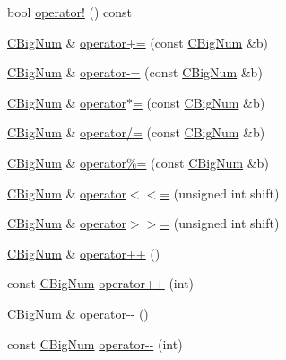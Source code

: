 \begin{DoxyCompactItemize}
\item 
bool \hyperlink{class_c_big_num_af7e5e3a2debd15e28edc59208eaf34ec}{operator!} () const 
\item 
\hyperlink{class_c_big_num}{C\+Big\+Num} \& \hyperlink{class_c_big_num_ac3da33626c8ab06d6a049b310c086dd5}{operator+=} (const \hyperlink{class_c_big_num}{C\+Big\+Num} \&b)
\item 
\hyperlink{class_c_big_num}{C\+Big\+Num} \& \hyperlink{class_c_big_num_a4fe724fd22129eefc4e1f34d95505381}{operator-\/=} (const \hyperlink{class_c_big_num}{C\+Big\+Num} \&b)
\item 
\hyperlink{class_c_big_num}{C\+Big\+Num} \& \hyperlink{class_c_big_num_aedd26ffda5c04c4765ba8e18d25d9ff0}{operator$\ast$=} (const \hyperlink{class_c_big_num}{C\+Big\+Num} \&b)
\item 
\hyperlink{class_c_big_num}{C\+Big\+Num} \& \hyperlink{class_c_big_num_a213f7dc5a2d8212d3e7402a06ee5d5b9}{operator/=} (const \hyperlink{class_c_big_num}{C\+Big\+Num} \&b)
\item 
\hyperlink{class_c_big_num}{C\+Big\+Num} \& \hyperlink{class_c_big_num_ac5bec8d967502c15e2dffc8600c933e6}{operator\%=} (const \hyperlink{class_c_big_num}{C\+Big\+Num} \&b)
\item 
\hyperlink{class_c_big_num}{C\+Big\+Num} \& \hyperlink{class_c_big_num_a784951e3a24199fa6b994a951453d156}{operator$<$$<$=} (unsigned int shift)
\item 
\hyperlink{class_c_big_num}{C\+Big\+Num} \& \hyperlink{class_c_big_num_a7d2759e104a02502891b185dfb704ad1}{operator$>$$>$=} (unsigned int shift)
\item 
\hyperlink{class_c_big_num}{C\+Big\+Num} \& \hyperlink{class_c_big_num_ac9421f22614796d8520be7e6ade71ee8}{operator++} ()
\item 
const \hyperlink{class_c_big_num}{C\+Big\+Num} \hyperlink{class_c_big_num_aa69e12c7f330374b2d86df0da0627e58}{operator++} (int)
\item 
\hyperlink{class_c_big_num}{C\+Big\+Num} \& \hyperlink{class_c_big_num_a47920287946fb3a55e84af70e953e78f}{operator-\/-\/} ()
\item 
const \hyperlink{class_c_big_num}{C\+Big\+Num} \hyperlink{class_c_big_num_a13d365561d5407fc624eacb6378db4d3}{operator-\/-\/} (int)
\end{DoxyCompactItemize}
